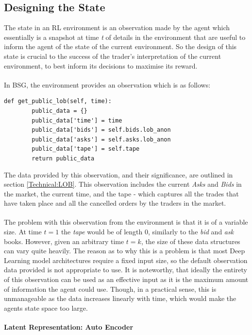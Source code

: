 \documentclass[ %
                    author={Ashwinder Khurana},
                supervisor={Prof Dave Cliff},
                    degree={MEng},
                     title={The Deeply Reinforced Trader},
                  subtitle={},
                      type={enterprise},
                      year={2020} ]{dissertation}
\begin{document}
{\subsection{Designing the State}

The state in an RL environment is an observation made by the agent which essentially is a snapshot at time \textit{t} of details in the environment that are useful to inform the agent of the state of the current environment. So the design of this state is crucial to the success of the trader's interpretation of the current environment, to best inform its decisions to maximise its reward. 
\\
\\
\noindent
In BSG, the environment provides an observation which is as follows:


\begin{lstlisting}[label=BSG-Obs, caption = BSG Environment Observation: LOB]
def get_public_lob(self, time):
        public_data = {}
        public_data['time'] = time
        public_data['bids'] = self.bids.lob_anon
        public_data['asks'] = self.asks.lob_anon
        public_data['tape'] = self.tape
        return public_data
\end{lstlisting}
\noindent
The data provided by this observation, and their significance, are outlined in section \ref{Technical:LOB}. This observation includes the current \textit{Asks} and \textit{Bids} in the market, the current time, and the tape - which captures all the trades that have taken place and all the cancelled orders by the traders in the market.
\\
\\
The problem with this observation from the environment is that it is of a variable size. At time $t=1$ the \textit{tape} would be of length 0, similarly to the \textit{bid} and \textit{ask} books. However, given an arbitrary time $t = k$, the size of these data structures can vary quite heavily. The reason as to why this is a problem is that most Deep Learning model architectures require a fixed input size, so the default observation data provided is not appropriate to use. It is noteworthy, that ideally the entirety of this observation can be used as an effective input as it is the maximum amount of information the agent could use. Though, in a practical sense, this is unmanageable as the data increases linearly with time, which would make the agents state space too large.
\\
\\
\textbf{Latent Representation: Auto Encoder}
}
\end{document}
